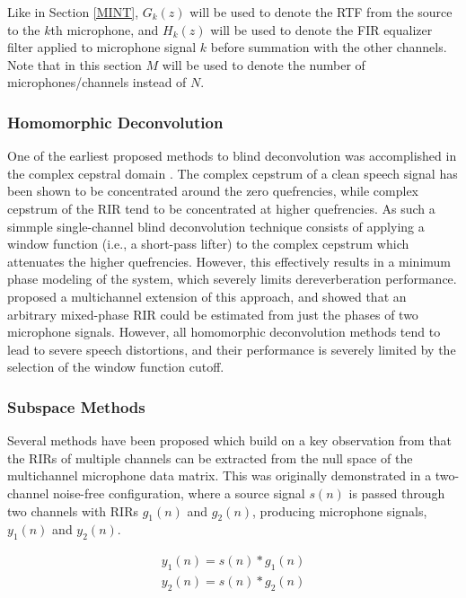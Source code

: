 Like in Section \ref{MINT}, $G_k(z)$ will be used to denote the RTF from the source to the $k$th microphone, and $H_k(z)$ will be used to denote the FIR equalizer filter applied to microphone signal $k$ before summation with the other channels. Note that in this section $M$ will be used to denote the number of microphones/channels instead of $N$.


\subsubsection{Homomorphic Deconvolution}

One of the earliest proposed methods to blind deconvolution was accomplished in the complex cepstral domain \citep{oppenheim1976digital}. The complex cepstrum of a clean speech signal has been shown to be concentrated around the zero quefrencies, while complex cepstrum of the RIR tend to be concentrated at higher quefrencies. As such a simmple single-channel blind deconvolution technique consists of applying a window function (i.e., a short-pass lifter) to the complex cepstrum which attenuates the higher quefrencies. However, this effectively results in a minimum phase modeling of the system, which severely limits dereverberation performance. \cite{petropulu1994cepstrum} proposed a multichannel extension of this approach, and showed that an arbitrary mixed-phase RIR could be estimated from just the phases of two microphone signals. However, all homomorphic deconvolution methods tend to lead to severe speech distortions, and their performance is severely limited by the selection of the window function cutoff. 


\subsubsection{Subspace Methods}

Several methods have been proposed which build on a key observation from \cite{gurelli1995evam} that the RIRs of multiple channels can be extracted from the null space of the multichannel microphone data matrix. This was originally demonstrated in a two-channel noise-free configuration, where a source signal $s(n)$ is passed through two channels with RIRs $g_1(n)$ and $g_2(n)$, producing microphone signals,$y_1(n)$ and $y_2(n)$.

\noindent
\begin{eqnarray}
	y_1(n) = s(n)*g_1(n) \\
	y_2(n) = s(n)*g_2(n)
\end{eqnarray}

